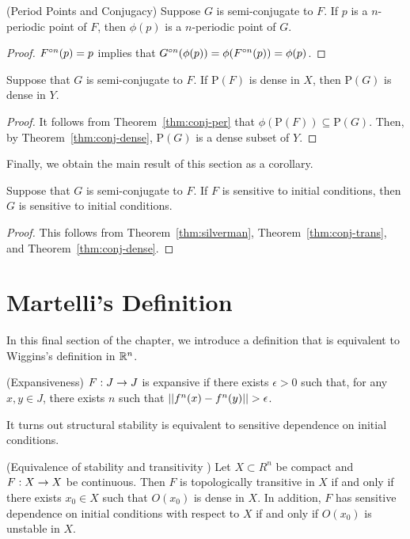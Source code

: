 \documentclass[12pt,draft,twoside]{book}
\begin{document}
  \begin{lemma}
    (Period Points and Conjugacy)
    Suppose $G$ is semi-conjugate to $F$.
    If $p$ is a $n$-periodic point of $F$, then $\phi(p)$ is a $n$-periodic point of $G$.
    \label{thm:conj-per}
    \begin{proof}
      $F^{\circ n}(p) = p$ implies that $G^{\circ n}(\phi(p)) = \phi(F^{\circ n}(p)) = \phi(p)$.
    \end{proof}
  \end{lemma}
\begin{theorem}
    Suppose that $G$ is semi-conjugate to $F$.
    If $\mathrm{P}(F)$ is dense in $X$, then $\mathrm{P}(G)$ is dense in $Y$.
    \label{cor:conj-dense-per}
    \begin{proof}
      It follows from Theorem~\ref{thm:conj-per} that $\phi(\mathrm{P}(F)) \subseteq \mathrm{P}(G)$.
      Then, by Theorem~\ref{thm:conj-dense}, $\mathrm{P}(G)$ is a dense subset of $Y$.
    \end{proof}
\end{theorem}
Finally, we obtain the main result of this section as a corollary.
\begin{corollary}
  Suppose that $G$ is semi-conjugate to $F$.
  If $F$ is sensitive to initial conditions, then $G$ is sensitive to initial conditions.
  \label{cor:conj-sdic}
  \begin{proof}
  This follows from Theorem~\ref{thm:silverman}, Theorem~\ref{thm:conj-trans}, and Theorem~\ref{thm:conj-dense}.
  \end{proof}
\end{corollary}

\section{Martelli's Definition}
In this final section of the chapter, we introduce a definition that is equivalent to Wiggins's definition in $\mathbb{R}^n$.
\citet{martellibook}

\begin{definition}
  (Expansiveness) $F: J\rightarrow J$ is expansive if there exists $\epsilon > 0$
  such that, for any $x,y\in J$, there exists $n$ such that
  $\left|\left| f^{n}(x)-f^{n}(y) \right|\right| > \epsilon$.
\end{definition}

It turns out structural stability is equivalent to sensitive dependence on initial conditions.
\begin{proposition}
  (Equivalence of stability and transitivity \citep{martelli})
  Let $X\subset R^n$ be compact and $F: X\rightarrow X$ be continuous.
  Then $F$ is topologically transitive in $X$ if and only if there exists $x_0\in X$ such that $O(x_0)$ is dense in $X$.
  In addition, $F$ has sensitive dependence on initial conditions with respect to $X$ if and only if $O(x_0)$ is unstable in $X$.
\end{proposition}
\end{document}
